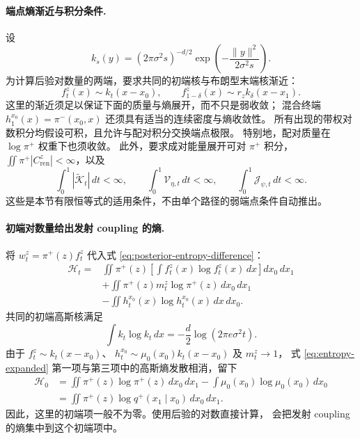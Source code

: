\documentclass[UTF8,a4paper,11pt,fontset=fandol]{ctexart}
\begin{document}
\paragraph{端点熵渐近与积分条件.}
设
\begin{equation}
k_s(y)=(2\pi\sigma^2s)^{-d/2}
\exp\left(-\frac{\|y\|^2}{2\sigma^2s}\right).
\end{equation}
为计算后验对数量的两端，要求共同的初端核与布朗型末端核渐近：
\begin{equation}
f_t^z(x)\sim k_t(x-x_0),\qquad
f_{1-\delta}^z(x)\sim r_z k_\delta(x-x_1).
\end{equation}
这里的渐近须足以保证下面的质量与熵展开，而不只是弱收敛；
混合终端 $h_1^{x_0}(x)=\pi^-(x_0,x)$ 还须具有适当的连续密度与熵收敛性。
所有出现的带权对数积分均假设可积，且允许与配对积分交换端点极限。
特别地，配对质量在 $\log\pi^+$ 权重下也须收敛。
此外，要求成对能量展开可对 $\pi^+$ 积分，
$\iint\pi^+|C_{\mathrm{ren}}^z|<\infty$，以及
\begin{equation}
\int_0^1|\widetilde{\mathcal K}_t|\,dt<\infty,\qquad
\int_0^1\mathcal V_{\eta,t}\,dt<\infty,\qquad
\int_0^1\mathcal J_{\psi,t}\,dt<\infty.
\label{eq:mixing-integrability}
\end{equation}
这些是本节有限恒等式的适用条件，不由单个路径的弱端点条件自动推出。

\paragraph{初端对数量给出发射 coupling 的熵.}
将 $w_t^z=\pi^+(z)f_t^z$ 代入式 \eqref{eq:posterior-entropy-difference}：
\begin{equation}
\begin{aligned}
\mathcal H_t
={}&\iint\pi^+(z)\left[\int f_t^z(x)\log f_t^z(x)\,dx\right]dx_0\,dx_1\\
&+\iint\pi^+(z)m_t^z\log\pi^+(z)\,dx_0\,dx_1\\
&-\iint h_t^{x_0}(x)\log h_t^{x_0}(x)\,dx\,dx_0.
\end{aligned}
\label{eq:entropy-expanded}
\end{equation}
共同的初端高斯核满足
\begin{equation}
\int k_t\log k_t\,dx=-\frac d2\log(2\pi e\sigma^2t).
\end{equation}
由于 $f_t^z\sim k_t(x-x_0)$、
$h_t^{x_0}\sim\mu_0(x_0)k_t(x-x_0)$ 及 $m_t^z\to1$，
式 \eqref{eq:entropy-expanded} 第一项与第三项中的高斯熵发散相消，留下
\begin{equation}
\begin{aligned}
\mathcal H_0
&=\iint\pi^+(z)\log\pi^+(z)\,dx_0\,dx_1
-\int\mu_0(x_0)\log\mu_0(x_0)\,dx_0\\
&=\iint\pi^+(z)\log q^+(x_1\mid x_0)\,dx_0\,dx_1.
\end{aligned}
\label{eq:initial-posterior-log}
\end{equation}
因此，这里的初端项一般不为零。使用后验的对数直接计算，
会把发射 coupling 的熵集中到这个初端项中。
\end{document}
